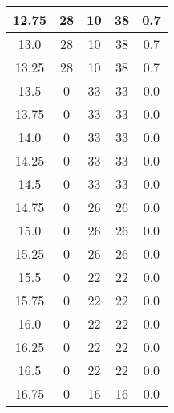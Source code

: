 \documentclass[letterpaper, 12pt]{article}
\begin{document}
\begin{longtable}{|c|c|c|c|c|}
\hline
12.75 & 28 & 10 & 38 & 0.7 \\
\hline
13.0 & 28 & 10 & 38 & 0.7 \\
\hline
13.25 & 28 & 10 & 38 & 0.7 \\
\hline
13.5 & 0 & 33 & 33 & 0.0 \\
\hline
13.75 & 0 & 33 & 33 & 0.0 \\
\hline
14.0 & 0 & 33 & 33 & 0.0 \\
\hline
14.25 & 0 & 33 & 33 & 0.0 \\
\hline
14.5 & 0 & 33 & 33 & 0.0 \\
\hline
14.75 & 0 & 26 & 26 & 0.0 \\
\hline
15.0 & 0 & 26 & 26 & 0.0 \\
\hline
15.25 & 0 & 26 & 26 & 0.0 \\
\hline
15.5 & 0 & 22 & 22 & 0.0 \\
\hline
15.75 & 0 & 22 & 22 & 0.0 \\
\hline
16.0 & 0 & 22 & 22 & 0.0 \\
\hline
16.25 & 0 & 22 & 22 & 0.0 \\
\hline
16.5 & 0 & 22 & 22 & 0.0 \\
\hline
16.75 & 0 & 16 & 16 & 0.0 \\
\hline
\end{longtable}
\end{document}
